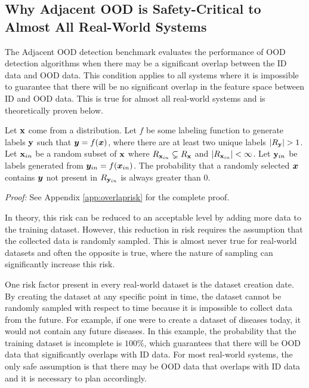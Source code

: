 \subsection{Why Adjacent OOD is Safety-Critical to Almost All Real-World Systems}

The Adjacent OOD detection benchmark evaluates the performance of OOD detection algorithms when there may be a significant overlap between the ID data and OOD data. This condition applies to all systems where it is impossible to guarantee that there will be no significant overlap in the feature space between ID and OOD data. This is true for almost all real-world systems and is theoretically proven below.

\begin{theorem}
Let ${\mathbf{x}}$ come from a distribution. Let $f$ be some labeling function to generate labels ${\mathbf{y}}$ such that ${\bm{y}} = f({\bm{x}})$, where there are at least two unique labels $|R_{\mathbf{y}}| > 1$. Let ${\mathbf{x}}_{in}$ be a random subset of ${\mathbf{x}}$ where $R_{{\mathbf{x}}_{in}} \subsetneq R_{\mathbf{x}}$ and $|R_{{\mathbf{x}}_{in}}| < \infty$. Let ${\mathbf{y}}_{in}$ be labels generated from ${\bm{y}}_{in} = f({\bm{x}}_{in})$. The probability that a randomly selected ${\bm{x}}$ contains ${\bm{y}}$ not present in $R_{{\mathbf{y}}_{in}}$ is always greater than $0$.
\label{mainbodyoverlap}
\end{theorem}

\textit{Proof:} See Appendix \ref{app:overlaprisk} for the complete proof.

In theory, this risk can be reduced to an acceptable level by adding more data to the training dataset. However, this reduction in risk requires the assumption that the collected data is randomly sampled. This is almost never true for real-world datasets and often the opposite is true, where the nature of sampling can significantly increase this risk.

One risk factor present in every real-world dataset is the dataset creation date. By creating the dataset at any specific point in time, the dataset cannot be randomly sampled with respect to time because it is impossible to collect data from the future. For example, if one were to create a dataset of diseases today, it would not contain any future diseases. In this example, the probability that the training dataset is incomplete is $100\%$, which guarantees that there will be OOD data that significantly overlaps with ID data. For most real-world systems, the only safe assumption is that there may be OOD data that overlaps with ID data and it is necessary to plan accordingly.

